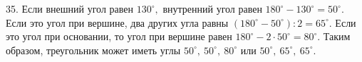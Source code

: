 35. Если внешний угол равен $130^\circ,$ внутренний угол равен $180^\circ-130^\circ=50^\circ.$ Если это угол при вершине, два других угла равны $(180^\circ-50^\circ):2=65^\circ.$ Если это угол при основании, то угол при вершине равен $180^\circ-2\cdot50^\circ=80^\circ.$ Таким образом, треугольник может иметь углы  $50^\circ,\ 50^\circ,\ 80^\circ$ или $50^\circ,\ 65^\circ,\ 65^\circ.$\\
